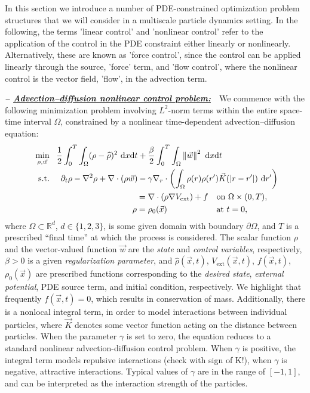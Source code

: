 In this section we introduce a number of PDE-constrained optimization problem structures that we will consider in a multiscale particle dynamics setting. In the following, the terms 'linear control' and 'nonlinear control' refer to the application of the control in the PDE constraint either linearly or nonlinearly. Alternatively, these are known as 'force control', since the control can be applied linearly through the source, 'force' term, and 'flow control', where the nonlinear control is the vector field, 'flow', in the advection term. 
\vspace{0.75em}

\textbf{\emph{-- \underline{Advection--diffusion nonlinear control problem:}}}~~We commence with the following minimization problem involving $L^2$-norm terms within the entire space-time interval $\Omega$, constrained by a nonlinear time-dependent advection--diffusion equation:
\begin{align}
\ \label{AdvDiff} \min_{\rho,\vec{w}}~~\frac{1}{2}\int_0^T\int_{\Omega}(\rho-\widehat{\rho})^2~{\rm d}x{\rm d}t+{}&\frac{\beta}{2}\int_0^T\int_{\Omega}\left\|\vec{w}\right\|^2~{\rm d}x{\rm d}t \\
\ \nonumber \text{s.t.}\quad~\partial_{t}\rho-\nabla^{2}\rho+\nabla\cdot(\rho\vec{w})-{}&\gamma\nabla_{r}\cdot\left(\int_{\Omega}\rho(r)\rho(r')\vec{K}(|r-r'|)~{\rm d}r'\right)\\
={}&\nabla\cdot(\rho\nabla{}V_{\text{ext}})+f\quad\text{on }\Omega\times(0,T), \\
\ \nonumber \rho={}&\rho_{0}(\vec{x})\quad\hspace{4.9em}\text{at }t=0,
\end{align}
where $\Omega\subset\mathbb{R}^{d}$, $d\in\{1,2,3\}$, is some given domain with boundary $\partial\Omega$, and $T$ is a prescribed ``final time'' at which the process is considered. The scalar function $\rho$ and the vector-valued function $\vec{w}$ are the \emph{state} and \emph{control variables}, respectively, $\beta>0$ is a given \emph{regularization parameter}, and $\widehat{\rho}(\vec{x},t)$, $V_{\text{ext}}(\vec{x},t)$, $f(\vec{x},t)$, $\rho_{0}(\vec{x})$ are prescribed functions corresponding to the \emph{desired state}, \emph{external potential}, PDE source term, and initial condition, respectively. We highlight that frequently $f(\vec{x},t)=0$,
which results in conservation of mass.
Additionally, there is a nonlocal integral term, in order to model interactions between individual particles, where $\vec{K}$ denotes some vector function acting on the distance between particles. When the parameter $\gamma$ is set to zero, the equation reduces to a standard nonlinear advection-diffusion control problem. When $\gamma$ is positive, the integral term models repulsive interactions (check with sign of K!), when $\gamma$ is negative, attractive interactions. Typical values of $\gamma$ are in the range of $[-1,1]$, and can be interpreted as the interaction strength of the particles.


